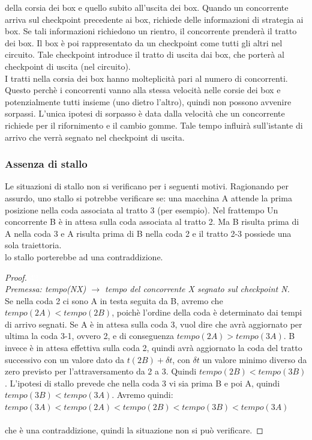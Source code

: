 della corsia dei box e quello subito all'uscita dei box.
Quando un concorrente arriva sul checkpoint precedente ai box, richiede delle
informazioni di strategia ai box. Se tali informazioni
richiedono un rientro, il concorrente prender\`{a} il tratto dei box. Il box
\`{e} poi rappresentato da un checkpoint come tutti gli altri nel circuito.
Tale checkpoint introduce il tratto di uscita dai box, che porter\`{a} al
checkpoint di uscita (nel circuito).\\
I tratti nella corsia dei box hanno molteplicit\`{a} pari al numero di
concorrenti. Questo perch\`{e} i concorrenti vanno alla stessa
velocit\`{a} nelle corsie dei box e potenzialmente tutti insieme (uno dietro
l'altro), quindi non possono avvenire sorpassi. L'unica ipotesi di
sorpasso \`{e} data dalla velocit\`{a} che un concorrente richiede per il
rifornimento e il cambio gomme. Tale tempo influir\`{a} sull'istante di arrivo
che verr\`{a} segnato nel checkpoint di uscita.
\subsubsection{Assenza di stallo}
Le situazioni di stallo non si verificano per i seguenti motivi. Ragionando per
assurdo, uno stallo si potrebbe verificare se:
una macchina A attende la prima posizione nella coda associata al tratto 3 (per
esempio). 
Nel frattempo Un concorrente B \`{e} in attesa sulla coda associata al tratto 2.
Ma B risulta prima di A nella coda 3 e A 
risulta prima di B nella coda 2 e il tratto 2-3 possiede una sola traiettoria.\\
lo stallo porterebbe ad una contraddizione.\\
\begin{proof}
\textcolor{white}{42}\\
\emph{Premessa: tempo(NX) $\rightarrow$ tempo del concorrente X segnato sul
checkpoint N.}\\
	Se nella coda 2 ci sono A in testa seguita da B, avremo che
$tempo(2A)<tempo(2B)$, poich\`{e} l'ordine della coda \`{e} 
	determinato dai tempi di arrivo segnati.
	Se A \`{e} in attesa sulla coda 3, vuol dire che avr\`{a} aggiornato per
ultima la coda 3-1, ovvero 2, e di conseguenza $tempo(2A)>tempo(3A)$.
	B invece \`{e} in attesa effettiva sulla coda 2, quindi avr\`{a}
aggiornato la coda del tratto successivo con un valore dato da $t(2B)+ \delta
t$, 
	con $ \delta t$ un valore minimo diverso da zero previsto per
l'attraversamento da 2 a 3. Quindi $tempo(2B)<tempo(3B)$.
	L'ipotesi di stallo prevede che nella coda 3 vi sia prima B e poi A,
quindi $tempo(3B)<tempo(3A)$.
	Avremo quindi:\\

	$tempo(3A)<tempo(2A)<tempo(2B)<tempo(3B)<tempo(3A)$\\\\
	che \`{e} una contraddizione, quindi la situazione non si pu\`{o}
verificare.
\end{proof}
